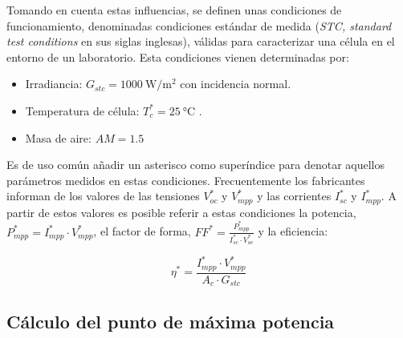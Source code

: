 Tomando en cuenta estas influencias, se definen unas condiciones de
funcionamiento, denominadas condiciones estándar de medida (\emph{STC,
standard test conditions} en sus siglas inglesas), válidas para caracterizar
una célula en el entorno de un laboratorio. Esta condiciones vienen
determinadas por:
\begin{itemize}
\item Irradiancia: $G_{stc}=\SI{1000}{\watt\per\meter\squared}$ con incidencia
normal.  
\item Temperatura de célula: $T_{c}^{*}=\SI{25}{\celsius}$  
 .
\item Masa de aire: $AM=1.5$
\end{itemize}
Es de uso común añadir un asterisco como superíndice para denotar
aquellos parámetros medidos en estas condiciones. Frecuentemente los
fabricantes informan de los valores de las tensiones $V_{oc}^{*}$
y $V_{mpp}^{*}$ y las corrientes $I_{sc}^{*}$ y $I_{mpp}^{*}$.
A partir de estos valores es posible referir a estas condiciones la
potencia, $P_{mpp}^{*}=I_{mpp}^{*}\cdot V_{mpp}^{*}$, el factor de
forma, $FF^{*}=\frac{P_{mpp}^{*}}{I_{sc}^{*}\cdot V_{oc}^{*}}$
y la eficiencia:

\begin{equation}
\eta^{*}=\frac{I_{mpp}^{*}\cdot V_{mpp}^{*}}{A_c\cdot G_{stc}}\label{eq:EficienciaCelula_STC}\end{equation}


\subsection{Cálculo del punto de máxima potencia\label{sub:CalculoMaximaPotencia}}

